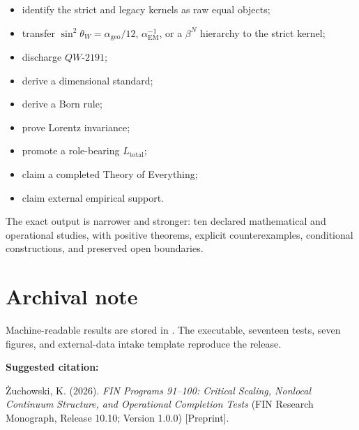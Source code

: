 \documentclass[11pt,a4paper,openany]{report}
\begin{document}
\begin{itemize}
\item 
identify the strict and legacy kernels as raw equal objects;

\item 
transfer \(\sin^2\theta_W=\alpha_{\mathrm{geo}}/12\), \(\alpha_{\mathrm{EM}}^{-1}\), or a \(\beta^N\) hierarchy to the strict kernel;

\item 
discharge \(QW\text{-}2191\);

\item 
derive a dimensional standard;

\item 
derive a Born rule;

\item 
prove Lorentz invariance;

\item 
promote a role-bearing \(L_{\mathrm{total}}\);

\item 
claim a completed Theory of Everything;

\item 
claim external empirical support.

\end{itemize}

The exact output is narrower and stronger: ten declared mathematical and operational studies, with positive theorems, explicit counterexamples, conditional constructions, and preserved open boundaries.


\clearpage
\chapter*{Archival note}
Machine-readable results are stored in
.
The executable, seventeen tests, seven figures, and external-data intake
template reproduce the release.

\medskip
\noindent\textbf{Suggested citation:}

\.Zuchowski, K. (2026). \emph{FIN Programs 91--100: Critical Scaling,
Nonlocal Continuum Structure, and Operational Completion Tests}
(FIN Research Monograph, Release 10.10; Version 1.0.0) [Preprint].
\end{document}
